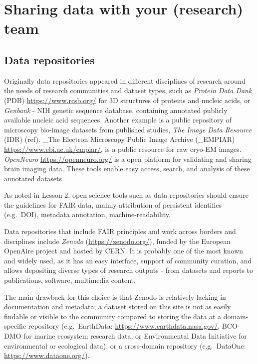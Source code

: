 \documentclass[
  letterpaper,
  DIV=11,
  numbers=noendperiod]{scrreport}
\begin{document}
\hypertarget{sharing-data-with-your-research-team}{%
\section{Sharing data with your (research)
team}\label{sharing-data-with-your-research-team}}

\hypertarget{data-repositories}{%
\subsection{Data repositories}\label{data-repositories}}

Originally data repositories appeared in different disciplines of
research around the needs of research communities and dataset types,
such as \emph{Protein Data Dank }(PDB) \url{https://www.rcsb.org/} for
3D structures of proteins and nucleic acids, or \emph{Genbank} - NIH
genetic sequence database, containing annotated publicly available
nucleic acid sequences. Another example is a public repository of
microscopy bio-image datasets from published studies, \emph{The Image
Data Resource} (IDR) (ref). \_The Electron Microscopy Public Image
Archive (\_EMPIAR) \url{https://www.ebi.ac.uk/empiar/}, is a public
resource for raw cryo-EM images. \emph{OpenNeuro}
\url{https://openneuro.org/} is a open platform for validating and
sharing brain imaging data. These tools enable easy access, search, and
analysis of these annotated datasets.

As noted in Lesson 2, open science tools such as data repositories
should ensure the guidelines for FAIR data, mainly attribution of
persistent identifies (e.g.~DOI), metadata annotation,
machine-readability.

Data repositories that include FAIR principles and work across borders
and disciplines include \emph{Zenodo} (\url{https://zenodo.org/}),
funded by the European OpenAire project and hosted by CERN. It is
probably one of the most known and widely used, as it has an easy
interface, support of community curation, and allows depositing diverse
types of research outputs - from datasets and reports to publications,
software, multimedia content.

The main drawback for this choice is that Zenodo is relatively lacking
in documentation and metadata; a dataset stored on this site is not as
easily findable or visible to the community compared to storing the data
at a domain-specific repository (e.g.~EarthData:
\url{https://www.earthdata.nasa.gov/}, BCO-DMO for marine ecosystem
research data, or Environmental Data Initiative for environmental or
ecological data), or a cross-domain repository (e.g.~DataOne:
\url{https://www.dataone.org/}).
\end{document}
